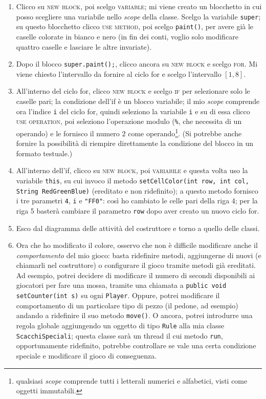\begin{itemize}
\begin{itemize}
\begin{itemize}
\begin{itemize}
\begin{enumerate}
	\item Clicco su \textsc{new block}, poi scelgo \textsc{variable}; mi viene creato un blocchetto in cui posso scegliere una variabile nello \emph{scope} della classe. Scelgo la variabile \texttt{super}; su questo blocchetto clicco \textsc{use method}, poi scelgo \texttt{paint()}, per avere già le caselle colorate in bianco e nero (in fin dei conti, voglio solo modificare quattro caselle e lasciare le altre invariate).
	\item Dopo il blocco \texttt{super.paint();}, clicco ancora su \textsc{new block} e scelgo \textsc{for}. Mi viene chiesto l'intervallo da fornire al ciclo for e scelgo l'intervallo $[1, 8]$.
	\item All'interno del ciclo for, clicco \textsc{new block} e scelgo \textsc{if} per selezionare solo le caselle pari; la condizione dell'if è un blocco variabile; il mio \emph{scope} comprende ora l'indice \texttt{i} del ciclo for, quindi seleziono la variabile \texttt{i} e su di essa clicco \textsc{use operation}, poi seleziono l'operazione modulo (\texttt{\%}, che necessita di un operando) e le fornisco il numero $2$ come operando\footnote{qualsiasi \emph{scope} comprende tutti i letterali numerici e alfabetici, visti come oggetti immutabili.}. (Si potrebbe anche fornire la possibilità di riempire direttamente la condizione del blocco in un formato testuale.) %
	\item All'interno dell'if, clicco su \textsc{new block}, poi \textsc{variabile} e questa volta uso la variabile \texttt{this}, su cui invoco il metodo \texttt{setCellColor(int row, int col, String RedGreenBlue)} (ereditato e non ridefinito); a questo metodo fornisco i tre parametri \texttt{4}, \texttt{i} e \texttt{"FF0"}: così ho cambiato le celle pari della riga 4; per la riga 5 basterà cambiare il parametro \texttt{row} dopo aver creato un nuovo ciclo for.
	\item Esco dal diagramma delle attività del costruttore e torno a quello delle classi.
	\item Ora che ho modificato il colore, osservo che non è difficile modificare anche il \emph{comportamento} del mio gioco: basta ridefinire metodi, aggiungerne di nuovi (e chiamarli nel costruttore) o configurare il gioco tramite metodi già ereditati. Ad esempio, potrei decidere di modificare il numero di secondi disponibili ai giocatori per fare una mossa, tramite una chiamata a \texttt{public void setCounter(int s)} su ogni \texttt{Player}. Oppure, potrei modificare il comportamento di un particolare tipo di pezzo (il pedone, ad esempio) andando a ridefinire il suo metodo \texttt{move()}. O ancora, potrei introdurre una regola globale aggiungendo un oggetto di tipo \texttt{Rule} alla mia classe \texttt{ScacchiSpeciali}; questa classe sarà un thread il cui metodo \texttt{run}, opportunamente ridefinito, potrebbe controllare se vale una certa condizione speciale e modificare il gioco di conseguenza.

\end{enumerate}
\end{itemize}
\end{itemize}
\end{itemize}
\end{itemize}
